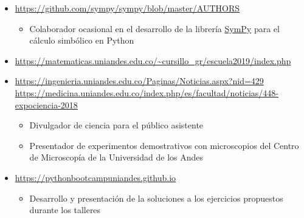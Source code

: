 \documentclass[11pt, letterpaper, sans]{moderncv}        %
\begin{document}
	\begin{itemize}
		\item{
			{
				\url{https://github.com/sympy/sympy/blob/master/AUTHORS}
				\vspace{3pt}
				\begin{itemize}
					\item Colaborador ocasional en el desarrollo de la librería \href{https://www.sympy.org/en/index.html}{\color{blue}SymPy} para el cálculo simbólico en {\color{blue}Python}
				\end{itemize}
			}
		}
		\item{
			{
				\url{https://matematicas.uniandes.edu.co/~cursillo_gr/escuela2019/index.php}
			}
		}
	
		\item{
			{
				\url{https://ingenieria.uniandes.edu.co/Paginas/Noticias.aspx?nid=429}\\
				\url{https://medicina.uniandes.edu.co/index.php/es/facultad/noticias/448-expociencia-2018}
				\vspace{3pt}
				\begin{itemize}
					\item Divulgador de ciencia para el p\'ublico asistente
					\item Presentador de experimentos demostrativos con microscopios del Centro de Microscop\'ia de la Universidad de los Andes
				\end{itemize}
			}
		}
	
		\item{
			{
				\url{https://pythonbootcampuniandes.github.io}
				\vspace{3pt}
				\begin{itemize}
					\item Desarrollo y presentación de la soluciones a los ejercicios propuestos durante los talleres
				\end{itemize}
			}
		}
	

\end{itemize}
\end{document}
